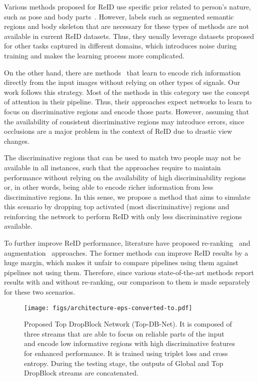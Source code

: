 \documentclass[a4paper,conference]{IEEEtran}
\begin{document}
Various methods proposed for ReID use specific prior related to person's nature, such as pose and body parts~\cite{quispe2019improved,kumar2017pose,zheng2019pose,li2017learning,cheng2016person}. However, labels such as segmented semantic regions and body skeleton that are necessary for these types of methods are not available in current ReID datasets. Thus, they usually leverage datasets proposed for other tasks captured in different domains, which introduces noise during training and makes the learning process more complicated.
 
On the other hand, there are methods~\cite{dai2019batch,li2018harmonious,hou2019interaction,xia2019second} that learn to encode rich information directly from the input images without relying on other types of signals. Our work follows this strategy. Most of the methods in this category use the concept of attention in their pipeline. Thus, their approaches expect networks to learn to focus on discriminative regions and encode those parts. However, assuming that the availability of consistent discriminative regions may introduce errors, since occlusions are a major problem in the context of ReID due to drastic view changes.
 
The discriminative regions that can be used to match two people may not be available in all instances, such that the approaches require to maintain performance without relying on the availability of high discriminability regions or, in other words, being able to encode richer information from less discriminative regions. In this sense, we propose a method that aims to simulate this scenario by dropping top activated (most discriminative) regions and reinforcing the network to perform ReID with only less discriminative regions available.
 
To further improve ReID performance, literature have proposed re-ranking~\cite{zhong2017re,saquib2018pose} and augmentation~\cite{zheng2019joint,zhong2018camstyle} approaches. The former methods can improve ReID results by a huge margin, which makes it unfair to compare pipelines using them against pipelines not using them. Therefore, since various state-of-the-art methods report results with and without re-ranking, our comparison to them is made separately for these two scenarios.
 
\begin{figure*}[!htb]
  \centering
  \texttt{[image: figs/architecture-eps-converted-to.pdf]}
  \caption{Proposed Top DropBlock Network (Top-DB-Net). It is composed of three streams that are able to focus on reliable parts of the input and encode low informative regions with high discriminative features for enhanced performance. It is trained using triplet loss and cross entropy. During the testing stage, the outputs of Global and Top DropBlock streams are concatenated.}
  \label{fig:architecture}
\end{figure*}
 
\end{document}
